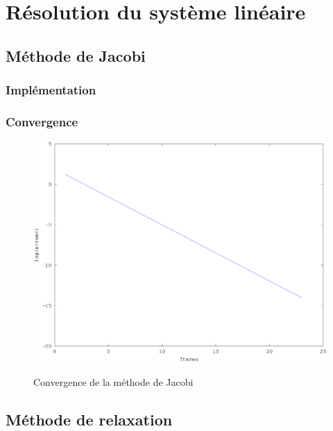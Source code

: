 \documentclass[a4paper,11pt]{article}
\begin{document}
\titleTMB 
\newpage
\tableofcontents
\newpage

\section{Résolution du système linéaire}

\subsection{Méthode de Jacobi}
\subsubsection{Implémentation}

\begin{multicols}{2}
  
\end{multicols}

\newpage
\subsubsection{Convergence}
\begin{figure}[h!]
  \begin{centering}
    \includegraphics[scale=0.5]{../jacobi_graph}
    \label{rspro2}
    \par\end{centering}
  \caption{Convergence de la méthode de Jacobi}
  \label{fig:jacobi-conv}
\end{figure}


\subsection{Méthode de relaxation}
\end{document}
